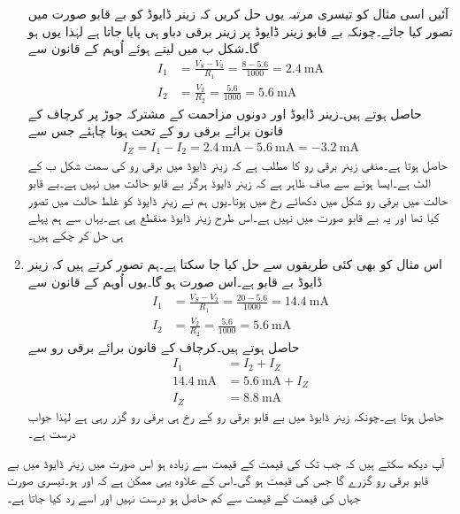 \begin{enumerate}
آئیں اسی مثال کو تیسری مرتبہ یوں حل کریں کہ زینر ڈایوڈ کو بے قابو صورت میں تصور کیا جائے۔چونکہ بے قابو زینر ڈایوڈ پر زینر برقی دباو ہی پایا جاتا ہے لہٰذا یوں  ہو گا۔شکل  ب میں  لیتے ہوئے  اُوہم کے قانون سے
\begin{align*}
I_1&=\frac{V_S-V_2}{R_1}=\frac{8-5.6}{1000}=\SI{2.4}{\milli \ampere}\\
I_2&=\frac{V_2}{R_2}=\frac{5.6}{1000}=\SI{5.6}{\milli \ampere}
\end{align*}
حاصل ہوتے ہیں۔زینر ڈایوڈ اور دونوں مزاحمت کے مشترکہ جوڑ پر کرچاف کے قانون برائے برقی رو کے تحت   ہونا چاہئے جس سے
\begin{align*}
I_Z=I_1-I_2=\SI{2.4}{\milli \ampere}-\SI{5.6}{\milli \ampere}=\SI{-3.2}{\milli \ampere}
\end{align*}
حاصل ہوتا ہے۔منفی زینر برقی رو کا مطلب ہے کہ زینر ڈایوڈ میں برقی رو کی سمت شکل  ب  کے الٹ ہے۔ایسا ہونے سے صاف ظاہر ہے کہ زینر ڈایوڈ ہرگز بے قابو حالت میں نہیں ہے۔بے قابو حالت میں برقی رو شکل میں دکھائے رخ میں ہوتا۔یوں ہم نے زینر ڈایوڈ کو غلط حالت میں تصور کیا تھا اور یہ بے قابو صورت میں نہیں ہے۔اس طرح زینر ڈایوڈ منقطع ہی ہے۔یہاں سے ہم پہلے ہی حل کر چکے ہیں۔
\item
اس مثال کو بھی کئی طریقوں سے حل کیا جا سکتا ہے۔ہم تصور کرتے ہیں کہ زینر ڈایوڈ بے قابو ہے۔اس صورت   ہو گا۔یوں  اُوہم کے قانون سے
\begin{align*}
I_1&=\frac{V_S-V_2}{R_1}=\frac{20-5.6}{1000}=\SI{14.4}{\milli \ampere}\\
I_2&=\frac{V_2}{R_2}=\frac{5.6}{1000}=\SI{5.6}{\milli \ampere}
\end{align*}
حاصل ہوتے ہیں۔کرچاف کے قانون برائے برقی رو سے
\begin{align*}
I_1&=I_2+I_Z\\
\SI{14.4}{\milli \ampere}&=\SI{5.6}{\milli \ampere}+I_Z\\
I_Z&=\SI{8.8}{\milli \ampere}
\end{align*}
حاصل ہوتا ہے۔چونکہ زینر ڈایوڈ میں بے قابو برقی رو کے رخ ہی برقی رو گزر رہی ہے لہٰذا جواب درست ہے۔
\end{enumerate}


آپ دیکھ سکتے ہیں کہ جب تک  کی قیمت  کے قیمت سے زیادہ ہو اس صورت میں زینر ڈایوڈ میں بے قابو برقی رو گزرے گا جس کی قیمت   ہو گی۔اس کے علاوہ یہی ممکن ہے کہ    اور    ہو۔تیسری صورت جہاں  کی قیمت  کے قیمت سے کم حاصل ہو درست نہیں اور اسے رد کیا جاتا ہے۔ 

